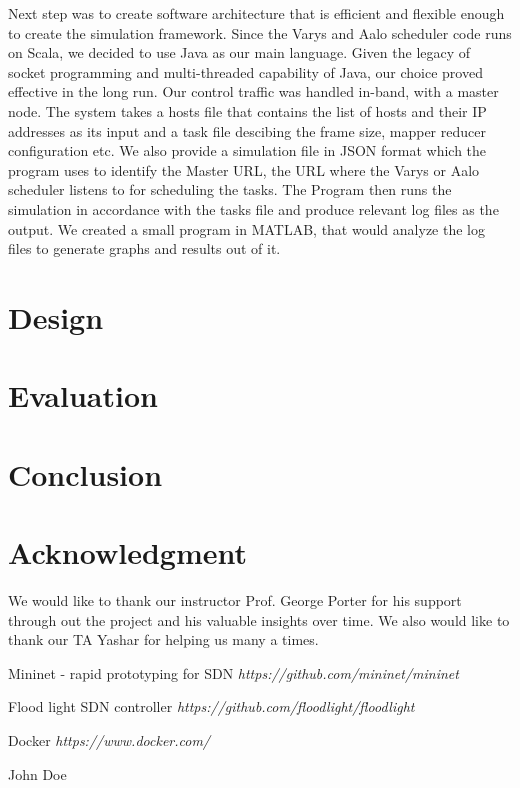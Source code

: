 \documentclass[conference]{IEEEtran}
\begin{document}
Next step was to create software architecture that is efficient and flexible enough to create the simulation framework. Since the Varys and Aalo scheduler code runs on Scala, we decided to use Java as our main language. Given the legacy of socket programming and multi-threaded capability of Java, our choice proved effective in the long run. Our control traffic was handled in-band, with a master node. The system takes a hosts file that contains the list of hosts and their IP addresses as its input and a task file descibing the frame size, mapper reducer configuration etc. We also provide a simulation file in JSON format which the program uses to identify the Master URL, the URL where the Varys or Aalo scheduler listens to for scheduling the tasks. The Program then runs the simulation in accordance with the tasks file and produce relevant log files as the output. We created a small program in MATLAB, that would analyze the log files to generate graphs and results out of it.

\section{Design}

\section{Evaluation}

\section{Conclusion}

\section*{Acknowledgment}
We would like to thank our instructor Prof. George Porter for his support through out the project and his valuable insights over time. We also would like to thank our TA Yashar for helping us many a times. 

\begin{thebibliography}{10}

Mininet - rapid prototyping for SDN
\textit{https://github.com/mininet/mininet}

Flood light SDN controller
\textit{https://github.com/floodlight/floodlight}

Docker
\textit{https://www.docker.com/}

\end{thebibliography}


\begin{IEEEbiography}{John Doe}
\blindtext
\end{IEEEbiography}
\end{document}
